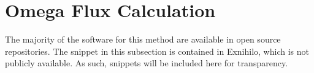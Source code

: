 \section{Omega Flux Calculation}
\label{sec:omega_code}

The majority of the software for this method are available in open source
repositories. The snippet in this subsection is contained in Exnihilo, which is
not publicly available. As such, snippets will be included here for
transparency.

\begin{footnotesize}

\end{footnotesize}

